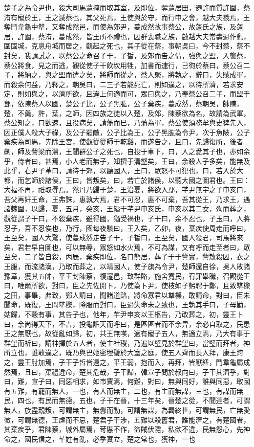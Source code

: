 \begin{pinyinscope}
楚子之為令尹也，殺大司馬薳掩而取其室，及即位，奪薳居田，遷許而質許圍，蔡洧有寵於王，王之滅蔡也，其父死焉，王使與於守，而行申之會，越大夫戮焉，王奪鬥韋龜中犨，又奪成然邑，而使為郊尹，蔓成然故事蔡公，故薳氏之族，及薳居，許圍，蔡洧，蔓成然，皆王所不禮也，因群喪職之族，啟越大夫常壽過作亂，圍固城，克息舟城而居之，觀起之死也，其子從在蔡，事朝吳曰，今不封蔡，蔡不封矣，我請試之，以蔡公之命召子干，子皙，及郊而告之情，強與之盟，入襲蔡，蔡公將食，見之而逃，觀從使子干飲坎用牲，加書而速行，已徇於蔡曰，蔡公召二子，將納之，與之盟而遣之矣，將師而從之，蔡人聚，將執之，辭曰，失賊成軍，而殺余何益，乃釋之，朝吳曰，二三子若能死亡，則如違之，以待所濟，若求安定，則如與之，以濟所欲，且違上何適而可，眾曰與之，乃奉蔡公召二子，而盟于鄧，依陳蔡人以國，楚公子比，公子黑肱，公子棄疾，蔓成然，蔡朝吳，帥陳，楚，不羹，許，葉，之師，因四族之徒以入楚，及郊，陳蔡欲為名，故請為武軍，蔡公知之，曰欲速，且役病矣，請藩而巳，乃藩為軍，蔡公使須務牟與史猈先入，因正僕人殺大子祿，及公子罷敵，公子比為王，公子黑肱為令尹，次于魚陂，公子棄疾為司馬，先除王宮，使觀從從師于乾谿，而遂告之，且曰，先歸復所，後者劓，師及訾梁而潰，王聞群公子之死也，自投于車下，曰，人之愛其子也，亦如余乎，侍者曰，甚焉，小人老而無子，知擠于溝壑矣，王曰，余殺人子多矣，能無及此乎，右尹子革曰，請待于郊，以聽國人，王曰，眾怒不可犯也，曰，若入於大都，而乞師於諸侯，王曰，皆叛矣，曰，若亡於諸侯，以聽大國之圖君也。王曰：大福不再，祇取辱焉。然丹乃歸于楚，王沿夏，將欲入鄢，芊尹無宇之子申亥曰，吾父再奸王命，王弗誅，惠孰大焉，君不可忍，惠不可棄，吾其從王，乃求王，遇諸棘圍，以歸，夏，五月，癸亥，王縊于芊尹申亥氏，申亥以其二女，殉而葬之，觀從謂子干曰，不殺棄疾，雖得國，猶受禍也，子干曰，余不忍也，子玉曰，人將忍子，吾不忍俟也，乃行，國每夜駭曰，王入矣，乙卯，夜，棄疾使周走而呼曰，王至矣，國人大驚，使蔓成然走告子干，子皙曰，王至矣，國人殺君，司馬將來矣，君若早自圖也，可以無辱，眾怒如水火焉，不可為謀，又有呼而走至者曰，眾至矣，二子皆自殺，丙辰，棄疾即位，名曰熊居，葬子于于訾實，訾敖殺囚，衣之王服，而流諸漢，乃取而葬之，以靖國人，使子旗為令尹，楚師還自徐，吳人敗諸豫章，獲其五帥，平王封陳蔡，復遷邑，致群賂，施舍寬民，宥罪舉職，召觀從王曰，唯爾所欲，對曰，臣之先佐開卜，乃使為卜尹，使枝如子躬聘于鄭，且致犨櫟之田，事畢，弗致，鄭人請曰，聞諸道路，將命寡君以犨櫟，敢請命，對曰，臣未聞命，既復，王問犨櫟，降服而對曰，臣過失命未之致也，王執其手曰，子毋勤，姑歸，不穀有事，其告子也，他年，芊尹申亥以王柩告，乃改葬之，初，靈王卜曰，余尚得天下，不吉，投龜詬天而呼曰，是區區者而不余畀，余必自取之，民患王之無厭也，故從亂如歸，初，共王無𠸄，適有寵子五人，無適立焉，乃大有事于群望而祈曰，請神擇於五人者，使主社稷，乃遍以璧見於群望曰，當璧而拜者，神所立也，誰敢違之，既乃與巴姬密埋璧於大室之庭，使五人齊而長入拜，康王跨之，靈王肘加焉，子干子皙皆遠之，平王弱，抱而入，再拜，皆厭紐，鬥韋龜屬成然焉，且曰，棄禮違命，楚其危哉，子干歸，韓宣子問於叔向曰，子干其濟乎，對曰，難，宣子曰，同惡相求，如市賈焉，何難，對曰，無與同好，誰與同惡，取國有五難，有寵而無人，一也，有人而無主，二也，有主而無謀，三也，有謀而無民，四也，有民而無德，五也，子干在晉，十三年矣，晉楚之從，不聞達者，可謂無人，族盡親叛，可謂無主，無釁而動，可謂無謀，為羇終世，可謂無民，亡無愛徵，可謂無德，王虐而不忌，楚君子干涉，五難以殺舊君，誰能濟之，有楚國者，其棄疾乎，君陳蔡，城外屬焉，苛慝不作，盜賊伏隱，私欲不違，民無怨心，先神命之，國民信之，芊姓有亂，必季實立，楚之常也，獲神，一也
\end{pinyinscope}
